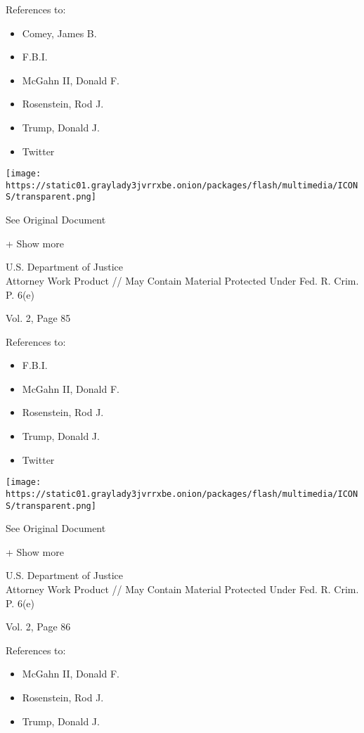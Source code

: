References to:

\begin{itemize}
\tightlist
\item
  Comey, James B.
\item
  F.B.I.
\item
  McGahn II, Donald F.
\item
  Rosenstein, Rod J.
\item
  Trump, Donald J.
\item
  Twitter
\end{itemize}

\protect\hyperlink{}{}

\texttt{[image: https://static01.graylady3jvrrxbe.onion/packages/flash/multimedia/ICONS/transparent.png]}

See Original Document

+ Show more

U.S. Department of Justice\\
Attorney Work Product // May Contain Material Protected Under Fed. R.
Crim. P. 6(e)

Vol. 2, Page 85

References to:

\begin{itemize}
\tightlist
\item
  F.B.I.
\item
  McGahn II, Donald F.
\item
  Rosenstein, Rod J.
\item
  Trump, Donald J.
\item
  Twitter
\end{itemize}

\protect\hyperlink{}{}

\texttt{[image: https://static01.graylady3jvrrxbe.onion/packages/flash/multimedia/ICONS/transparent.png]}

See Original Document

+ Show more

U.S. Department of Justice\\
Attorney Work Product // May Contain Material Protected Under Fed. R.
Crim. P. 6(e)

Vol. 2, Page 86

References to:

\begin{itemize}
\tightlist
\item
  McGahn II, Donald F.
\item
  Rosenstein, Rod J.
\item
  Trump, Donald J.
\end{itemize}

